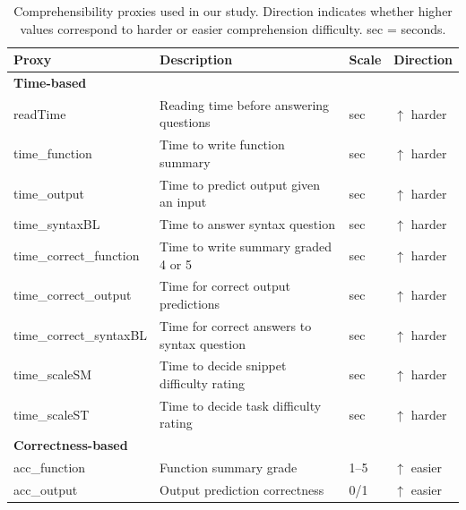 \begin{table}[t]
\scriptsize
\centering
\caption{Comprehensibility proxies used in our study. Direction indicates whether higher values correspond to harder or easier comprehension difficulty. sec = seconds.}
\label{tab:proxies}

\begin{tabularx}{\columnwidth}{l X l l}
\toprule
\textbf{Proxy} & \textbf{Description} & \textbf{Scale} & \textbf{Direction} \\
\midrule

\multicolumn{4}{l}{\textbf{Time-based}} \\

readTime & Reading time before answering questions & sec & $\uparrow$ harder \\

time\_function & Time to write function summary & sec & $\uparrow$ harder \\

time\_output & Time to predict output given an input & sec & $\uparrow$ harder \\

time\_syntaxBL & Time to answer syntax question & sec & $\uparrow$ harder \\

time\_correct\_function & Time to write summary graded 4 or 5 & sec & $\uparrow$ harder \\

time\_correct\_output & Time for correct output predictions & sec & $\uparrow$ harder \\

time\_correct\_syntaxBL & Time for correct answers to syntax question & sec & $\uparrow$ harder \\

time\_scaleSM & Time to decide snippet difficulty rating & sec & $\uparrow$ harder \\

time\_scaleST & Time to decide task difficulty rating & sec & $\uparrow$ harder \\

\midrule

\multicolumn{4}{l}{\textbf{Correctness-based}} \\

acc\_function & Function summary grade & 1--5 & $\uparrow$ easier \\

acc\_output & Output prediction correctness & 0/1 & $\uparrow$ easier \\


\end{tabularx}
\end{table}
